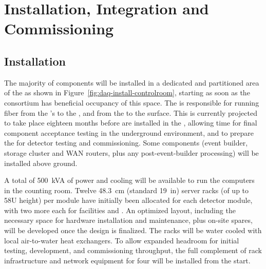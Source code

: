 
\section{Installation, Integration and Commissioning}
\label{sec:fdsp-daq-install}

\subsection{Installation}
\label{sec:fdsp-daq-install-transport}

The majority of  components will be installed in a dedicated and partitioned area of the  as shown in Figure~\ref{fig:daq-install-controlroom}, starting as soon as the consortium has beneficial occupancy of this space. %
The  is responsible for running fiber from the 's  to the , and from the  to the surface. This is currently projected to take place eighteen months before  are installed in the , allowing time for final component acceptance testing in the underground environment, and to prepare the  for detector testing and commissioning. Some  components (event builder, storage cluster and WAN routers, plus any post-event-builder processing) will be installed above ground.

A total of \SI{500}{kVA} of power and cooling will be available to run the computers in the counting room. 
Twelve \SI{48.3}{cm} (standard \SI{19}{in}) server racks (of up to 58U height) per module have initially been allocated for each detector module, with two more each for facilities and . An optimized layout, including the necessary space for hardware installation and maintenance, plus on-site spares, will be developed once the  design is finalized. The racks will be water cooled with local air-to-water heat exchangers. To allow expanded headroom for initial testing, development, and commissioning throughput, the full complement of rack infrastructure and network equipment for four  will be installed from the start.  %

